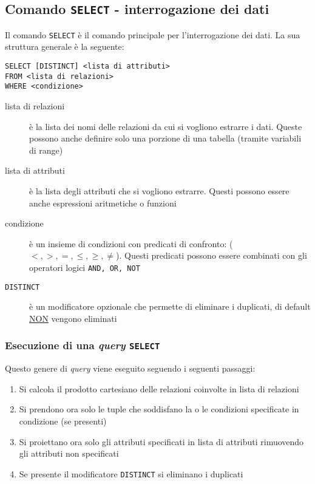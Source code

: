     \subsection{Comando \texttt{SELECT} - interrogazione dei dati}
        Il comando \texttt{SELECT} è il comando principale per l'interrogazione dei dati. La sua struttura generale è la seguente:
        \begin{lstlisting}
SELECT [DISTINCT] <lista di attributi>
FROM <lista di relazioni>
WHERE <condizione>
        \end{lstlisting}
        \begin{description}
            \item[\<lista di relazioni\>] è la lista dei nomi delle relazioni da cui si vogliono estrarre i dati. Queste possono anche definire solo una porzione di una tabella (tramite variabili di range)
            \item[\<lista di attributi\>] è la lista degli attributi che si vogliono estrarre. Questi possono essere anche espressioni aritmetiche o funzioni
            \item[\<condizione\>] è un insieme di condizioni con predicati di confronto: ($<,>,=,\leq, \geq,\neq $). Questi predicati possono essere combinati con gli operatori logici \texttt{AND, OR, NOT}
            \item[\texttt{DISTINCT}] è un modificatore opzionale che permette di eliminare i duplicati, di default \underline{NON} vengono eliminati
        \end{description}
        \subsubsection{Esecuzione di una \textit{query} \texttt{SELECT}}
            Questo genere di \textit{query} viene eseguito seguendo i seguenti passaggi:
            \begin{enumerate}
                \item Si calcola il prodotto cartesiano delle relazioni coinvolte in \<lista di relazioni\>
                \item Si prendono ora solo le tuple che soddisfano la o le condizioni specificate in \<condizione\> (se presenti)
                \item Si proiettano ora solo gli attributi specificati in \<lista di attributi\> rimuovendo gli attributi non specificati
                \item Se presente il modificatore \texttt{DISTINCT} si eliminano i duplicati
            \end{enumerate}
